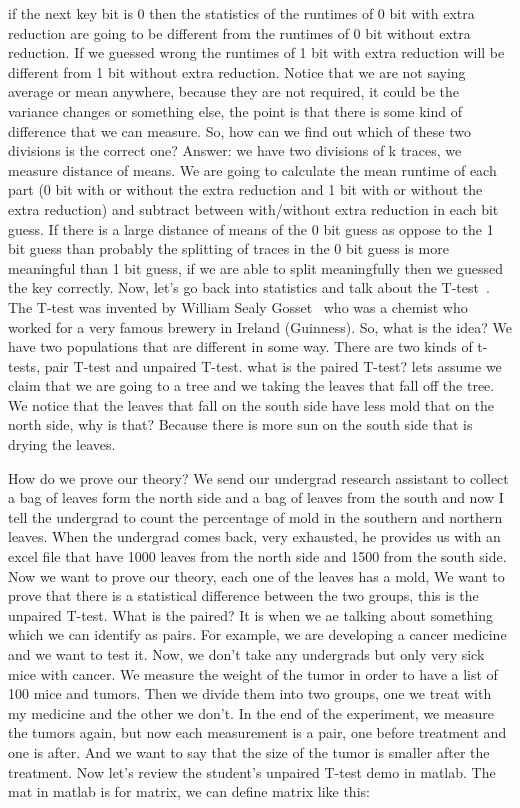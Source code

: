 if the next key bit is 0 then the statistics of the runtimes of 0 bit with extra reduction are going to be different from the runtimes of 0 bit without extra reduction. If we guessed wrong the runtimes of 1 bit with extra reduction will be different from 1 bit without extra reduction. Notice that we are not saying average or mean anywhere, because they are not required, it could be the variance changes or something else, the point is that there is some kind of difference that we can measure. So, how can we find out which of these two divisions is the correct one? Answer: we have two divisions of k traces, we measure distance of means. We are going to calculate the mean runtime of each part (0 bit with or without the extra reduction and 1 bit with or without the extra reduction) and subtract between with/without extra reduction in each bit guess. If there is a large distance of means of the 0 bit guess as oppose to the 1 bit guess than probably the splitting of traces in the 0 bit guess is more meaningful than 1 bit guess, if we are able to split meaningfully then we guessed the key correctly. 
Now, let’s go back into statistics and talk about the T-test~\cite{wikittest}. The T-test was invented by William Sealy Gosset~\cite{wikigosset} who was a chemist who worked for a very famous brewery in Ireland (Guinness). So, what is the idea? We have two populations that are different in some way. There are two kinds of t-tests, pair T-test and unpaired T-test. what is the paired T-test? lets assume we claim that we are going to a tree and we taking the leaves that fall off the tree. We notice that the leaves that fall on the south side have less mold that on the north side, why is that? Because there is more sun on the south side that is drying the leaves. 

How do we prove our theory? We send our undergrad research assistant to collect a bag of leaves form the north side and a bag of leaves from the south and now I tell the undergrad to count the percentage of mold in the southern and northern leaves. When the undergrad comes back, very exhausted, he provides us with an excel file that have 1000 leaves from the north side and 1500 from the south side. Now we want to prove our theory, each one of the leaves has a mold, We want to prove that there is a statistical difference between the two groups, this is the unpaired T-test. What is the paired? It is when we ae talking about something which we can identify as pairs. For example, we are developing a cancer medicine and we want to test it. Now, we don’t take any undergrads but only very sick mice with cancer. We measure the weight of the tumor in order to have a list of 100 mice and tumors. Then we divide them into two groups, one we treat with my medicine and the other we don’t. In the end of the experiment, we measure the tumors again, but now each measurement is a pair, one before treatment and one is after. And we want to say that the size of the tumor is smaller after the treatment. 
Now let’s review the student's unpaired T-test demo in matlab. The mat in matlab is for matrix, we can define matrix like this:

